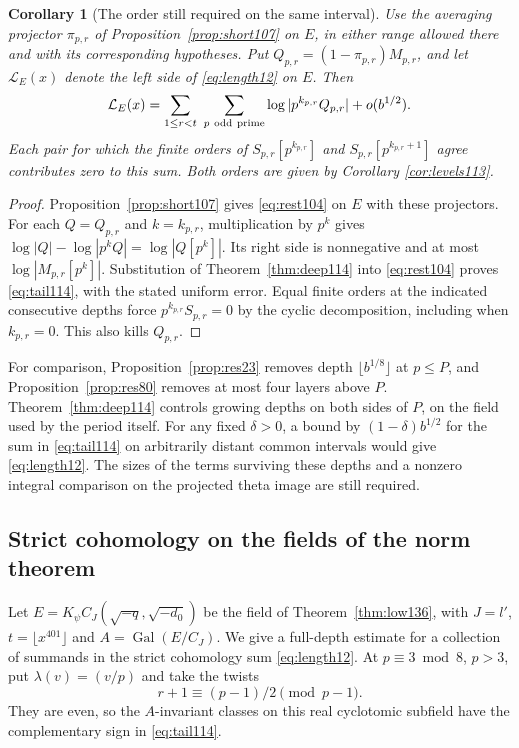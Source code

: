 \documentclass[a4paper,11pt]{article}
\newtheorem{corollary}[proposition]{Corollary}
\theoremstyle{definition}
\theoremstyle{remark}
\numberwithin{equation}{section}
\begin{document}
\begin{corollary}[The order still required on the same interval]
\label{cor:tail114}
Use the averaging projector \(\pi_{p,r}\) of
Proposition~\ref{prop:short107} on \(E\), in either range allowed
there and with its corresponding hypotheses. Put
\(Q_{p,r}=(1-\pi_{p,r})M_{p,r}\), and let \(\mathcal L_E(x)\)
denote the left side of \eqref{eq:length12} on \(E\). Then
\begin{equation}
 \mathcal L_E(x)=
    \sum_{1\le r<t}\ \sum_{p\ {\rm odd\ prime}}
          \log|p^{k_{p,r}}Q_{p,r}|+o(b^{1/2}).          \label{eq:tail114}
\end{equation}
Each pair for which the finite orders of \(S_{p,r}[p^{k_{p,r}}]\)
and \(S_{p,r}[p^{k_{p,r}+1}]\) agree contributes zero to this
sum. Both orders are given by
Corollary \ref{cor:levels113}.
\end{corollary}
\begin{proof}
Proposition~\ref{prop:short107} gives \eqref{eq:rest104} on
\(E\) with these projectors. For each \(Q=Q_{p,r}\) and
\(k=k_{p,r}\), multiplication by \(p^k\) gives
\(\log|Q|-\log|p^k Q|=\log|Q[p^k]|\). Its right side is
nonnegative and at most \(\log|M_{p,r}[p^k]|\). Substitution
of Theorem~\ref{thm:deep114} into \eqref{eq:rest104} proves
\eqref{eq:tail114}, with the stated uniform error. Equal finite
orders at the indicated consecutive depths force
\(p^{k_{p,r}}S_{p,r}=0\) by the cyclic decomposition, including
when \(k_{p,r}=0\). This also kills \(Q_{p,r}\).
\end{proof}

For comparison, Proposition~\ref{prop:res23} removes depth
\(\lfloor b^{1/8}\rfloor\) at \(p\le P\), and
Proposition~\ref{prop:res80} removes at most four layers above
\(P\). Theorem~\ref{thm:deep114} controls growing depths on
both sides of \(P\), on the field used by the period itself.
For any fixed \(\delta>0\), a bound by
\((1-\delta)b^{1/2}\) for the sum in \eqref{eq:tail114} on
arbitrarily distant common intervals would give
\eqref{eq:length12}. The sizes of the terms surviving
these depths and a nonzero integral comparison on the projected
theta image are still required.

\subsection{Strict cohomology on the fields of the norm theorem}\label{nav:II-31}
Let \(E=K_\psi C_J(\sqrt{-q},\sqrt{-d_0})\) be the field of
Theorem~\ref{thm:low136}, with \(J=l'\), \(t=\lfloor x^{401}\rfloor\)
and \(A=\operatorname{Gal}(E/C_J)\). We give a full-depth
estimate for a collection of summands in the strict cohomology
sum \eqref{eq:length12}. At \(p\equiv3\bmod8\), \(p>3\), put
\(\lambda(v)=(v/p)\) and take the twists
\[
             r+1\equiv(p-1)/2\pmod{p-1}.
\]
They are even, so the \(A\)-invariant classes on this real
cyclotomic subfield have the complementary sign in
\eqref{eq:tail114}.
\end{document}

